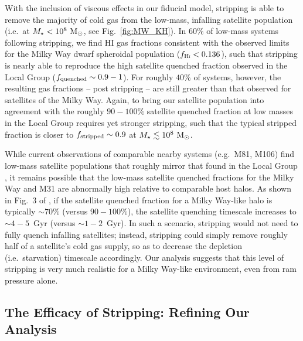 \documentclass[usenatbib]{mn2e}
\newcommand{\mstar}{{M}_{\star}}
\newcommand{\msun}{{\rm M}_{\odot}}
\begin{document}
With the inclusion of viscous effects in our fiducial model, stripping
is able to remove the majority of cold gas from the low-mass,
infalling satellite population (i.e.~at $\mstar < 10^{8}~\msun$, see
Fig.~\ref{fig:MW_KH}).
%
In $60\%$ of low-mass systems following stripping, we find
H{\scriptsize I} gas fractions consistent with the observed limits for
the Milky Way dwarf spheroidal population ($f_{\rm
  H\scalebox{0.45}{\rm I}} < 0.136$), such that stripping is nearly
able to reproduce the high satellite quenched fraction observed in the
Local Group ($f_{\rm quenched} \sim 0.9-1$).
%
For roughly $40\%$ of systems, however, the resulting gas fractions --
post stripping -- are still greater than that observed for satellites
of the Milky Way.
%
Again, to bring our satellite population into agreement with the
roughly $90-100\%$ satellite quenched fraction at low masses in the
Local Group requires yet stronger stripping, such that the typical
stripped fraction is closer to $f_{\rm stripped} \sim 0.9$ at $\mstar
\lesssim 10^{8}~\msun$.


While current observations of comparable nearby systems (e.g.~M81,
M106) find low-mass satellite populations that roughly mirror that
found in the Local Group \citep{kaisin13, spencer14}, it remains
possible that the low-mass satellite quenched fractions for the Milky
Way and M31 are abnormally high relative to comparable host halos.
%
As shown in Fig.~3 of \citet{fham15}, if the satellite quenched
fraction for a Milky Way-like halo is typically $\sim70\%$ (versus
$90-100\%$), the satellite quenching timescale increases to
$\sim4-5$~Gyr (versus $\sim1-2$~Gyr). 
%
In such a scenario, stripping would not need to fully quench infalling
satellites; instead, stripping could simply remove roughly half of a
satellite's cold gas supply, so as to decrease the depletion
(i.e.~starvation) timescale accordingly.
%
Our analysis suggests that this level of stripping is very much
realistic for a Milky Way-like environment, even from ram pressure
alone.



\subsection{The Efficacy of Stripping: Refining Our Analysis}
\end{document}
